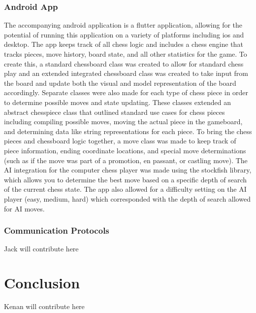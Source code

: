 \documentclass[11pt,journal]{IEEEtran}
\begin{document}
\subsubsection{Android App}
The accompanying android application is a flutter application, allowing for the potential of running this application on a variety of platforms including ios and desktop. The app keeps track of all chess logic and includes a chess engine that tracks pieces, move history, board state, and all other statistics for the game. To create this, a standard chessboard class was created to allow for standard chess play and an extended integrated chessboard class was created to take input from the board and update both the visual and model representation of the board accordingly. Separate classes were also made for each type of chess piece in order to determine possible moves and state updating. These classes extended an abstract chesspiece class that outlined standard use cases for chess pieces including compiling possible moves, moving the actual piece in the gameboard, and determining data like string representations for each piece. To bring the chess pieces and chessboard logic together, a move class was made to keep track of piece information, ending coordinate locations, and special move determinations (such as if the move was part of a promotion, en passant, or castling move). The AI integration for the computer chess player was made using the stockfish library, which allows you to determine the best move based on a specific depth of search of the current chess state. \cite{stockfish} The app also allowed for a difficulty setting on the AI player (easy, medium, hard) which corresponded with the depth of search allowed for AI moves.
\subsubsection{Communication Protocols}
Jack will contribute here



% 


\section{Conclusion}
Kenan will contribute here
\end{document}

